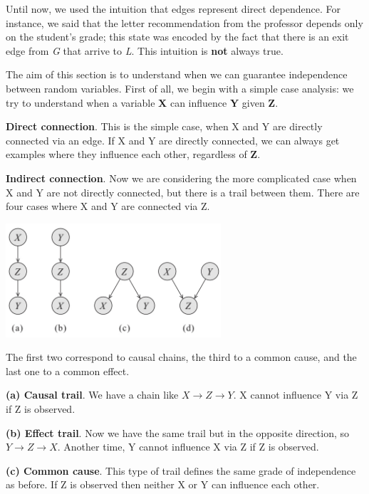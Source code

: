 Until now, we used the intuition that edges represent direct dependence. For instance, we said that the letter recommendation from the professor depends only on the student's grade;
this state was encoded by the fact that there is an exit edge from \textit{G} that arrive to \textit{L}. This intuition is \textbf{not} always true. \vspace{3.5pt}

The aim of this section is to understand when we can guarantee independence between random variables. First of all, we begin with a simple case analysis: we try to understand
when a variable \textbf{X} can influence \textbf{Y} given \textbf{Z}. \vspace{3.5pt}

\textbf{Direct connection}. This is the simple case, when X and Y are directly connected via an edge. If X and Y are directly connected, we can always get examples where they 
influence each other, regardless of \textbf{Z}. \vspace{3.5pt}

\textbf{Indirect connection}. Now  we are considering the more complicated case when X and Y are not directly connected, but there is a trail between them. There are four cases
where X and Y are connected via Z. \vspace{3.5pt}
\begin{center}
    \includegraphics[width=0.6\textwidth]{img/img5.png}
\end{center} \vspace{3.5pt}
The first two correspond to causal chains, the third to a common cause, and the last one to a common effect.

\textbf{(a) Causal trail}. We have a chain like $X \rightarrow Z \rightarrow Y$. X cannot influence Y via Z if Z is observed.

\textbf{(b) Effect trail}. Now we have the same trail but in the opposite direction, so  $Y \rightarrow Z \rightarrow X$. Another time, Y cannot influence X via Z if Z is observed.

\textbf{(c) Common cause}. This type of trail defines the same grade of independence as before. If Z is observed then neither X or Y can influence each other. 


